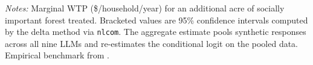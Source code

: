 \begin{table}[h]
\begin{threeparttable}
\begin{tabularx}{\textwidth}{l XXXX}
\end{tabularx}
\begin{tablenotes}\footnotesize
\item \textit{Notes:} Marginal WTP (\$/household/year) for an additional acre of socially important forest treated. 
Bracketed values are 95\% confidence intervals computed by the delta method via \texttt{nlcom}. The aggregate estimate pools synthetic responses across all nine LLMs and re-estimates the conditional logit on the pooled data.
Empirical benchmark from \textcite{Giguere2020}.
\end{tablenotes}
\end{threeparttable}
\end{table}
